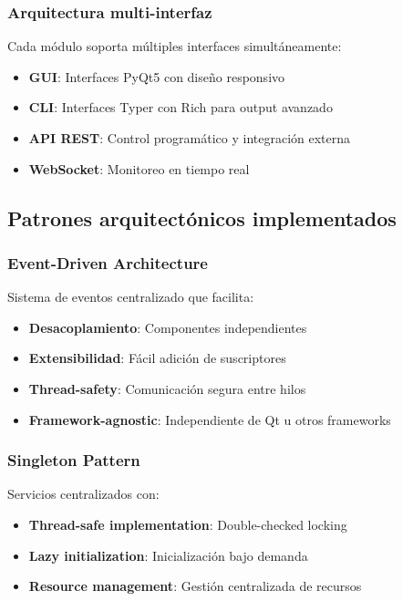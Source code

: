 \subsubsection{Arquitectura multi-interfaz}
Cada módulo soporta múltiples interfaces simultáneamente:

\begin{itemize}
    \item \textbf{GUI}: Interfaces PyQt5 con diseño responsivo
    \item \textbf{CLI}: Interfaces Typer con Rich para output avanzado
    \item \textbf{API REST}: Control programático y integración externa
    \item \textbf{WebSocket}: Monitoreo en tiempo real
\end{itemize}

\subsection{Patrones arquitectónicos implementados}
\label{subsec:patrones_arquitectonicos_impl}

\subsubsection{Event-Driven Architecture}
Sistema de eventos centralizado que facilita:

\begin{itemize}
    \item \textbf{Desacoplamiento}: Componentes independientes
    \item \textbf{Extensibilidad}: Fácil adición de suscriptores
    \item \textbf{Thread-safety}: Comunicación segura entre hilos
    \item \textbf{Framework-agnostic}: Independiente de Qt u otros frameworks
\end{itemize}

\subsubsection{Singleton Pattern}
Servicios centralizados con:

\begin{itemize}
    \item \textbf{Thread-safe implementation}: Double-checked locking
    \item \textbf{Lazy initialization}: Inicialización bajo demanda
    \item \textbf{Resource management}: Gestión centralizada de recursos
\end{itemize}

